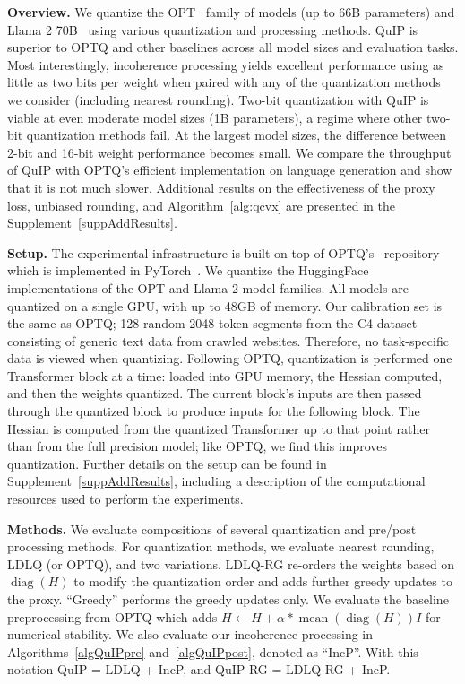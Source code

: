 \textbf{Overview.}
We quantize the OPT~\citep{meta2022opt} family of models (up to 66B parameters) and Llama 2 70B~\citep{meta2023llama} using various quantization and processing methods.
QuIP is superior to OPTQ and other baselines across all model sizes and evaluation tasks.
Most interestingly, incoherence processing yields excellent performance using as little as two bits per weight when paired with any of the quantization methods we consider (including nearest rounding). Two-bit quantization with QuIP is viable at even moderate model sizes (1B parameters), a regime where other two-bit quantization methods fail. At the largest model sizes, the difference between 2-bit and 16-bit weight performance becomes small.
We compare the throughput of QuIP with OPTQ's efficient implementation on language generation and show that it is not much slower.
Additional results on the effectiveness of the proxy loss, unbiased rounding, and Algorithm~\ref{alg:qcvx} are presented in the Supplement~\ref{suppAddResults}.

\textbf{Setup.} 
The experimental infrastructure is built on top of OPTQ's~\citep{frantar2023gptq} repository which is implemented in PyTorch~\citep{paszke2019pytorch}.
We quantize the HuggingFace implementations of the OPT and Llama 2 model families.
All models are quantized on a single GPU, with up to 48GB of memory.
Our calibration set is the same as OPTQ; 128 random 2048 token segments from the C4 dataset~\citep{raffel2020c4} consisting of generic text data from crawled websites.
Therefore, no task-specific data is viewed when quantizing.
Following OPTQ, quantization is performed one Transformer block at a time:
loaded into GPU memory, the Hessian computed, and then the weights quantized.
The current block's inputs are then passed through the quantized block to produce inputs for the following block.
The Hessian is computed from the quantized Transformer up to that point rather than from the full precision model;
like OPTQ, we find this improves quantization.
Further details on the setup can be found in Supplement~\ref{suppAddResults}, including a description of the computational resources used to perform the experiments.


\textbf{Methods.}
We evaluate compositions of several quantization and pre/post processing methods.
For quantization methods, we evaluate nearest rounding, LDLQ (or OPTQ), and two variations.
LDLQ-RG re-orders the weights based on $\operatorname{diag}(H)$ to modify the quantization order and adds further greedy updates to the proxy.
``Greedy'' performs the greedy updates only.
We evaluate the baseline preprocessing from OPTQ which adds $H \gets H +\alpha * \operatorname{mean}(\operatorname{diag}(H))I$
for numerical stability. 
We also evaluate our incoherence processing in Algorithms~\ref{algQuIPpre} and~\ref{algQuIPpost}, denoted as ``IncP''.
With this notation QuIP = LDLQ + IncP, and QuIP-RG = LDLQ-RG + IncP.

